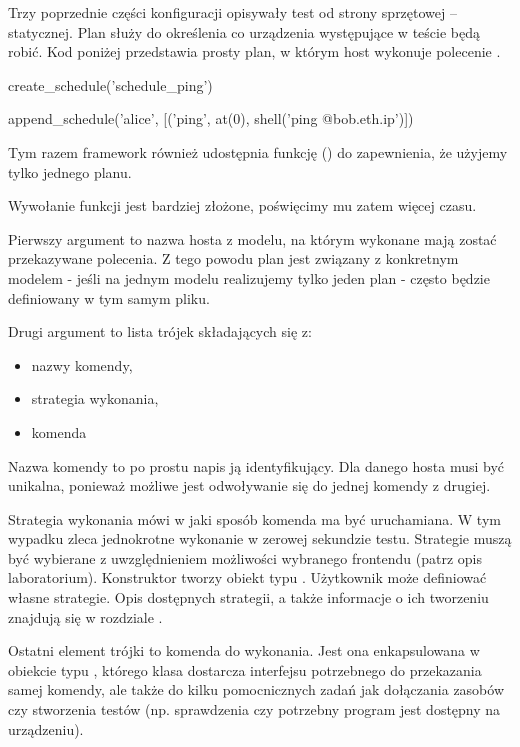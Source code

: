 \documentclass[00-praca-magisterska.tex]{subfiles}
\begin{document}
Trzy poprzednie części konfiguracji opisywały test od strony sprzętowej --
statycznej. Plan służy do określenia co urządzenia występujące w teście będą
robić. Kod poniżej przedstawia prosty plan, w którym host wykonuje polecenie
.

\begin{pythoncode}
  create_schedule('schedule_ping')

  append_schedule('alice', [('ping', at(0), shell('ping @{bob.eth.ip}')])
\end{pythoncode}

Tym razem framework również udostępnia funkcję () do
zapewnienia, że użyjemy tylko jednego planu.

Wywołanie funkcji  jest bardziej złożone, poświęcimy mu
zatem więcej czasu.

Pierwszy argument to nazwa hosta z modelu, na którym wykonane mają zostać
przekazywane polecenia. Z tego powodu plan jest związany z konkretnym modelem -
jeśli na jednym modelu realizujemy tylko jeden plan - często będzie definiowany
w tym samym pliku.

Drugi argument to lista trójek składających się z:
\begin{itemize}
\item nazwy komendy,
\item strategia wykonania,
\item komenda
\end{itemize}

Nazwa komendy to po prostu napis ją identyfikujący. Dla danego hosta musi być
unikalna, ponieważ możliwe jest odwoływanie się do jednej komendy z drugiej.

Strategia wykonania mówi w jaki sposób komenda ma być uruchamiana. W tym
wypadku  zleca jednokrotne wykonanie w zerowej sekundzie testu.
Strategie muszą być wybierane z uwzględnieniem możliwości wybranego frontendu
(patrz opis laboratorium). Konstruktor  tworzy obiekt typu
. Użytkownik może definiować własne strategie. Opis dostępnych
strategii, a także informacje o ich tworzeniu znajdują się w rozdziale
.

Ostatni element trójki to komenda do wykonania. Jest ona enkapsulowana w
obiekcie typu , którego klasa dostarcza interfejsu
potrzebnego do przekazania samej komendy, ale także do kilku pomocnicznych
zadań jak dołączania zasobów czy stworzenia testów (np. sprawdzenia czy
potrzebny program jest dostępny na urządzeniu).
\end{document}
